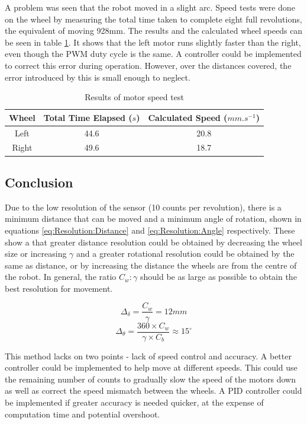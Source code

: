 A problem was seen that the robot moved in a slight arc. Speed tests were done on the wheel by measuring the total time taken to complete eight full revolutions, the equivalent of moving 928mm. The results and the calculated wheel speeds can be seen in table \ref{table:results:motor:speed}. It shows that the left motor runs slightly faster than the right, even though the PWM duty cycle is the same. A controller could be implemented to correct this error during operation. However, over the distances covered, the error introduced by this is small enough to neglect. 

\begin{table}
\caption{Results of motor speed test}
\label{table:results:motor:speed}
\centering
\begin{tabular}{|c|c|c|} \hline
Wheel &	Total Time Elapsed ($s$) & Calculated Speed ($mm.s^{-1}$) \\ \hline
Left & 44.6		&	20.8 \\ \hline
Right & 49.6	&	18.7 \\ \hline
\end{tabular}
\end{table}

\subsection{Conclusion}
Due to the low resolution of the sensor (10 counts per revolution), there is a minimum distance that can be moved and a minimum angle of rotation, shown in equations \eqref{eq:Resolution:Distance} and \eqref{eq:Resolution:Angle} respectively. These show a that greater distance resolution could be obtained by decreasing the wheel size or increasing $\gamma$ and a greater rotational resolution could be obtained by the same as distance, or by increasing the distance the wheels are from the centre of the robot. In general, the ratio $C_w:\gamma$ should be as large as possible to obtain the best resolution for movement.


\begin{equation}\label{eq:Resolution:Distance}
\Delta_{\delta} = \frac{C_w}{\gamma} = 12mm
\end{equation}
\begin{equation}\label{eq:Resolution:Angle}
\Delta_{\theta} = \frac{360 \times C_w}{\gamma \times C_b} \approx 15^\circ 
\end{equation}

This method lacks on two points - lack of speed control and accuracy.
A better controller could be implemented to help move at different speeds. This could use the remaining number of counts to gradually slow the speed of the motors down as well as correct the speed mismatch between the wheels. A PID controller could be implemented if greater accuracy is needed quicker, at the expense of computation time and potential overshoot. 

